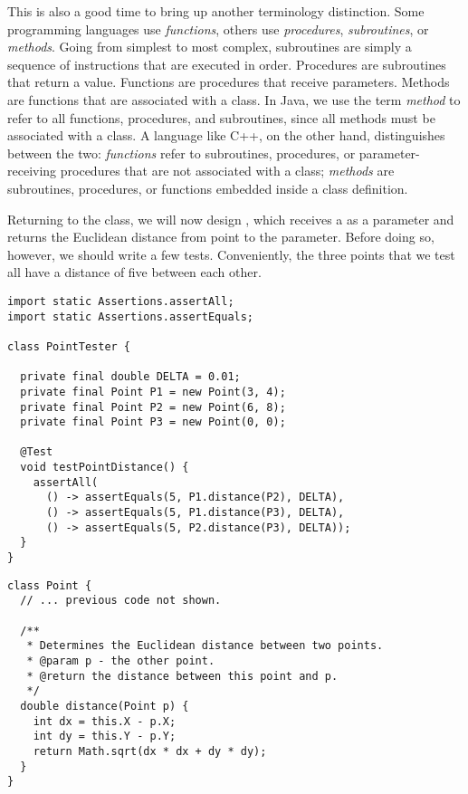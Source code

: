 This is also a good time to bring up another terminology distinction. 
Some programming languages use \emph{functions}, others use \emph{procedures}, \emph{subroutines}, or \emph{methods}. 
Going from simplest to most complex, subroutines are simply a sequence of instructions that are executed in order. 
Procedures are subroutines that return a value. 
Functions are procedures that receive parameters. 
Methods are functions that are associated with a class. 
In Java, we use the term \emph{method} to refer to all functions, procedures, and subroutines, since all methods must be associated with a class. 
A language like C++, on the other hand, distinguishes between the two: \emph{functions} refer to subroutines, procedures, or parameter-receiving procedures that are not associated with a class; \emph{methods} are subroutines, procedures, or functions embedded inside a class definition.

Returning to the  class, we will now design , which receives a  as a parameter and returns the Euclidean distance from  point to the parameter. 
Before doing so, however, we should write a few tests. 
Conveniently, the three points that we test all have a distance of five between each other.

\begin{lstlisting}[language=MyJava]
import static Assertions.assertAll;
import static Assertions.assertEquals;

class PointTester {

  private final double DELTA = 0.01;
  private final Point P1 = new Point(3, 4);
  private final Point P2 = new Point(6, 8);
  private final Point P3 = new Point(0, 0);

  @Test
  void testPointDistance() {
    assertAll(
      () -> assertEquals(5, P1.distance(P2), DELTA),
      () -> assertEquals(5, P1.distance(P3), DELTA),
      () -> assertEquals(5, P2.distance(P3), DELTA));
  }
}
\end{lstlisting}

\enlargethispage{-6\baselineskip}
\begin{lstlisting}[language=MyJava]
class Point {
  // ... previous code not shown.

  /**
   * Determines the Euclidean distance between two points.
   * @param p - the other point.
   * @return the distance between this point and p.
   */
  double distance(Point p) {
    int dx = this.X - p.X;
    int dy = this.Y - p.Y;
    return Math.sqrt(dx * dx + dy * dy);
  }
}
\end{lstlisting}


